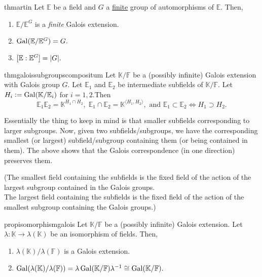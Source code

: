 \begin{restatable}{thm}{artin}
\label{thm:artin}
    Let $\mathbb{E}$ be a field and $G$ a \underline{finite} group of automorphisms of $\mathbb{E}.$ Then,
    \begin{enumerate}
         \item $\mathbb{E}/\mathbb{E}^G$ is a \emph{finite} Galois extension.
         \item $\operatorname{Gal}(\mathbb{E}/\mathbb{E}^G) = G.$
         \item $[\mathbb{E} : \mathbb{E}^G] = {\left\lvert G \right\lvert}.$ \hfill\hyperref[thm:artin2]{\downsym}
     \end{enumerate} 
\end{restatable}

\begin{restatable}[]{thm}{galoissubgroupscompositum}
\label{thm:galoissubgroupscompositum}
    Let $\mathbb{K}/\mathbb{F}$ be a {\color{purple}(possibly infinite)} Galois extension with Galois group $G.$ Let $\mathbb{E}_1$ and $\mathbb{E}_2$ be intermediate subfields of $\mathbb{K}/\mathbb{F}.$ Let $H_i \vcentcolon= \operatorname{Gal}(\mathbb{K}/\mathbb{E}_i)$ for $i = 1, 2.$Then
    \begin{equation*} 
        \mathbb{E}_1\mathbb{E}_2 = \mathbb{K}^{H_1 \cap H_2},\; \mathbb{E}_1 \cap \mathbb{E}_2 = \mathbb{K}^{\langle H_1, H_2\rangle}, \text{ and } \mathbb{E}_1 \subset \mathbb{E}_2 \iff H_1 \supset H_2.
    \end{equation*} \hfill\hyperref[thm:galoissubgroupscompositum2]{\downsym}
\end{restatable}

\begin{rem}
    Essentially the thing to keep in mind is that smaller subfields corresponding to larger subgroups. Now, given two subfields/subgroups, we have the corresponding smallest (or largest) subfield/subgroup containing them (or being contained in them). The above shows that the Galois correspondence (in one direction) preserves them.

    (The smallest field containing the subfields is the fixed field of the action of the largest subgroup contained in the Galois groups.\\
    The largest field containing the subfields is the fixed field of the action of the smallest subgroup containing the Galois groups.)
\end{rem}

\begin{restatable}[]{prop}{isomorphismgalois}
\label{prop:isomorphismgalois}
    Let $\mathbb{K}/\mathbb{F}$ be a {\color{purple}(possibly infinite)} Galois extension. Let $\lambda : \mathbb{K} \to \lambda(\mathbb{K})$ be an isomorphism of fields. Then,
    \begin{enumerate}
         \item $\lambda(\mathbb{K})/\lambda(\mathbb{F})$ is a Galois extension.
         \item $\operatorname{Gal}(\lambda(\mathbb{K})/\lambda(\mathbb{F})) = \lambda \operatorname{Gal}(\mathbb{K}/\mathbb{F}) \lambda^{-1} \cong \operatorname{Gal}(\mathbb{K}/\mathbb{F}).$ \hfill\hyperref[prop:isomorphismgalois2]{\downsym}
    \end{enumerate} 
\end{restatable}

